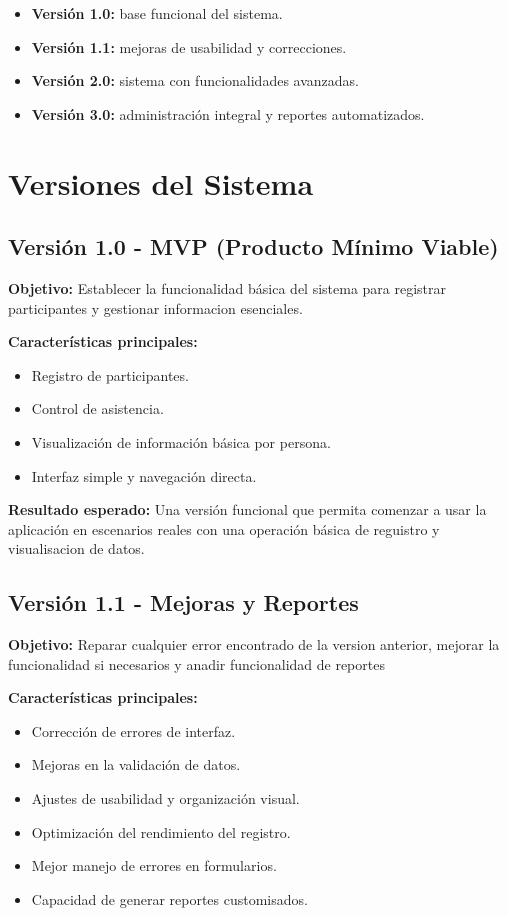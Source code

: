 \documentclass[11pt,a4paper]{article}
\begin{document}
\begin{itemize}[leftmargin=1.5em]
    \item \textbf{Versión 1.0:} base funcional del sistema.
    \item \textbf{Versión 1.1:} mejoras de usabilidad y correcciones.
    \item \textbf{Versión 2.0:} sistema con funcionalidades avanzadas.
    \item \textbf{Versión 3.0:} administración integral y reportes automatizados.
\end{itemize}

\section{Versiones del Sistema}

\subsection{Versión 1.0 - MVP (Producto Mínimo Viable)}
\textbf{Objetivo:}\newline
Establecer la funcionalidad básica del sistema para registrar participantes y gestionar informacion esenciales.

\textbf{Características principales:}
\begin{itemize}[leftmargin=1.5em]
    \item Registro de participantes.
    \item Control de asistencia.
    \item Visualización de información básica por persona.
    \item Interfaz simple y navegación directa.
\end{itemize}

\textbf{Resultado esperado:}\newline
Una versión funcional que permita comenzar a usar la aplicación en escenarios reales con una operación básica de reguistro y visualisacion de datos.

\subsection{Versión 1.1 - Mejoras y Reportes}
\textbf{Objetivo:}\newline
Reparar cualquier error encontrado de la version anterior, mejorar la funcionalidad si necesarios y anadir funcionalidad de reportes

\textbf{Características principales:}
\begin{itemize}[leftmargin=1.5em]
    \item Corrección de errores de interfaz.
    \item Mejoras en la validación de datos.
    \item Ajustes de usabilidad y organización visual.
    \item Optimización del rendimiento del registro.
    \item Mejor manejo de errores en formularios.
    \item Capacidad de generar reportes customisados.
\end{itemize}
\end{document}
